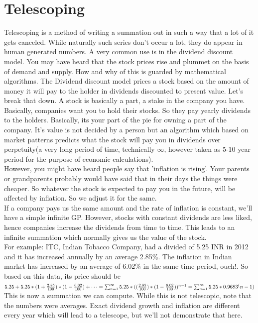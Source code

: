 \section{Telescoping}
Telescoping is a method of writing a summation out in such a way that a lot of it gets canceled. While naturally such series don't occur a lot, they do appear in human generated numbers. A very common use is in the dividend discount model. You may have heard that the stock prices rise and plummet on the basis of demand and supply. How and why of this is guarded by mathematical algorithms. The Dividend discount model prices a stock based on the amount of money it will pay to the holder in dividends discounted to present value. Let's break that down. A stock is basically a part, a stake in the company you have. Basically, companies want you to hold their stocks. So they pay yearly dividends to the holders. Basically, its your part of the pie for owning a part of the company. It's value is not decided by a person but an algorithm which based on market patterns predicts what the stock will pay you in dividends over perpetuity(a very long period of time, technically $\infty$, however taken as 5-10 year period for the purpose of economic calculations).\\
However, you might have heard people say that 'inflation is rising'. Your parents or grandparents probably would have said that in their days the things were cheaper. So whatever the stock is expected to pay you in the future, will be affected by inflation. So we adjust it for the same.\\
If a company pays us the same amount and the rate of inflation is constant, we'll have a simple infinite GP. However, stocks with constant dividends are less liked, hence companies increase the dividends from time to time. This leads to an infinite summation which normally gives us the value of the stock.\\
For example: ITC, Indian Tobacco Company, had a divided of 5.25 INR in 2012 and it has increased annually by an average 2.85\%. The inflation in Indian market has increased by an average of 6.02\% in the same time period, ouch!. So based on this data, its price should be $5.25+5.25*(1+\frac{2.85}{100})*(1-\frac{6.02}{100})+\dots = \sum^{\infty}_{n=1}5.25*((\frac{2.85}{100})*(1-\frac{6.02}{100}))^{n-1}\\
=\sum^{\infty}_{n=1}5.25*0.9683^(n-1)$\\
This is now a summation we can compute. While this is not telescopic, note that the numbers were averages. Exact dividend growth and inflation are different every year which will lead to a telescope, but we'll not demonstrate that here.\\
